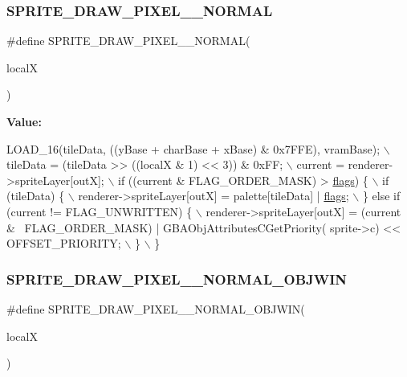 \subsubsection{\texorpdfstring{S\+P\+R\+I\+T\+E\+\_\+\+D\+R\+A\+W\+\_\+\+P\+I\+X\+E\+L\+\_\+\_\+\+N\+O\+R\+M\+AL}{SPRITE\_DRAW\_PIXEL\_256\_NORMAL}}
{\footnotesize\ttfamily \#define S\+P\+R\+I\+T\+E\+\_\+\+D\+R\+A\+W\+\_\+\+P\+I\+X\+E\+L\+\_\+\_\+\+N\+O\+R\+M\+AL(\begin{DoxyParamCaption}\item[{}]{localX }\end{DoxyParamCaption})}

{\bfseries Value\+:}
\begin{DoxyCode}
LOAD\_16(tileData, ((yBase + charBase + xBase) & 0x7FFE), vramBase); \(\backslash\)
    tileData = (tileData >> ((localX & 1) << 3)) & 0xFF; \(\backslash\)
    current = renderer->spriteLayer[outX]; \(\backslash\)
    if ((current & FLAG\_ORDER\_MASK) > \mbox{\hyperlink{lr35902_2decoder_8c_a11f29eea941556f0630cfd3285f565c0}{flags}}) \{ \(\backslash\)
        if (tileData) \{ \(\backslash\)
            renderer->spriteLayer[outX] = palette[tileData] | \mbox{\hyperlink{lr35902_2decoder_8c_a11f29eea941556f0630cfd3285f565c0}{flags}}; \(\backslash\)
        \} \textcolor{keywordflow}{else} \textcolor{keywordflow}{if} (current != FLAG\_UNWRITTEN) \{ \(\backslash\)
            renderer->spriteLayer[outX] = (current & ~FLAG\_ORDER\_MASK) | GBAObjAttributesCGetPriority(
      sprite->c) << OFFSET\_PRIORITY; \(\backslash\)
        \} \(\backslash\)
    \}
\end{DoxyCode}
\mbox{\label{software-obj_8c_a535415ad5ac53efd197e489850f4c3e4}} 
\subsubsection{\texorpdfstring{S\+P\+R\+I\+T\+E\+\_\+\+D\+R\+A\+W\+\_\+\+P\+I\+X\+E\+L\+\_\+\_\+\+N\+O\+R\+M\+A\+L\+\_\+\+O\+B\+J\+W\+IN}{SPRITE\_DRAW\_PIXEL\_256\_NORMAL\_OBJWIN}}
{\footnotesize\ttfamily \#define S\+P\+R\+I\+T\+E\+\_\+\+D\+R\+A\+W\+\_\+\+P\+I\+X\+E\+L\+\_\+\_\+\+N\+O\+R\+M\+A\+L\+\_\+\+O\+B\+J\+W\+IN(\begin{DoxyParamCaption}\item[{}]{localX }\end{DoxyParamCaption})}

